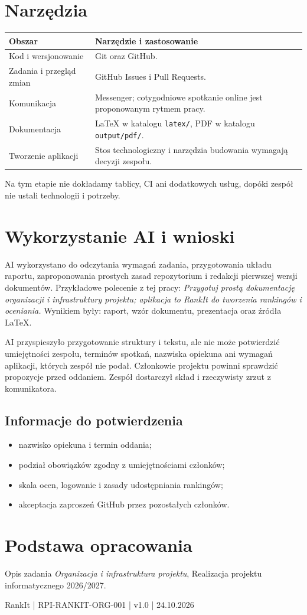 \documentclass[11pt,a4paper]{article}
\begin{document}
\section{Narzędzia}
\begin{tabularx}{\textwidth}{p{}L}
  \toprule
  \textbf{Obszar} & \textbf{Narzędzie i zastosowanie} \\
  \midrule
  Kod i wersjonowanie & Git oraz GitHub. \\
  Zadania i przegląd zmian & GitHub Issues i Pull Requests. \\
  Komunikacja & Messenger; cotygodniowe spotkanie online jest proponowanym rytmem pracy. \\
  Dokumentacja & LaTeX w katalogu \texttt{latex/}, PDF w katalogu \texttt{output/pdf/}. \\
  Tworzenie aplikacji & Stos technologiczny i narzędzia budowania wymagają decyzji zespołu. \\
  \bottomrule
\end{tabularx}

Na tym etapie nie dokładamy tablicy, CI ani dodatkowych usług, dopóki zespół nie ustali technologii i potrzeby.

\section{Wykorzystanie AI i wnioski}
AI wykorzystano do odczytania wymagań zadania, przygotowania układu raportu, zaproponowania prostych zasad repozytorium i redakcji pierwszej wersji dokumentów. Przykładowe polecenie z tej pracy: \emph{Przygotuj prostą dokumentację organizacji i infrastruktury projektu; aplikacja to RankIt do tworzenia rankingów i oceniania.} Wynikiem były: raport, wzór dokumentu, prezentacja oraz źródła LaTeX.

AI przyspieszyło przygotowanie struktury i tekstu, ale nie może potwierdzić umiejętności zespołu, terminów spotkań, nazwiska opiekuna ani wymagań aplikacji, których zespół nie podał. Członkowie projektu powinni sprawdzić propozycje przed oddaniem. Zespół dostarczył skład i rzeczywisty zrzut z komunikatora.

\subsection*{Informacje do potwierdzenia}
\begin{itemize}
  \item nazwisko opiekuna i termin oddania;
  \item podział obowiązków zgodny z umiejętnościami członków;
  \item skala ocen, logowanie i zasady udostępniania rankingów;
  \item akceptacja zaproszeń GitHub przez pozostałych członków.
\end{itemize}

\section*{Podstawa opracowania}
Opis zadania \emph{Organizacja i infrastruktura projektu}, Realizacja projektu informatycznego 2026/2027.

\vfill
\begin{center}\small RankIt | RPI-RANKIT-ORG-001 | v1.0 | 24.10.2026\end{center}
\end{document}
